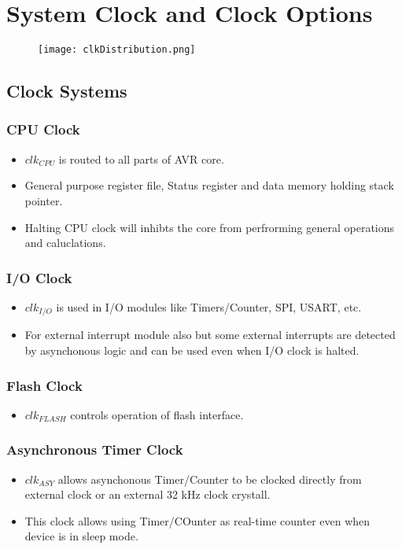 \section{System Clock and Clock Options}
\begin{figure}[H]
    \begin{center}
        \texttt{[image: clkDistribution.png]}
    \end{center}
\end{figure}

\subsection{Clock Systems}
\subsubsection{CPU Clock}
\begin{itemize}
    \item $clk_{CPU}$ is routed to all parts of AVR core.
    \item General purpose register file, Status register and data memory holding stack pointer.
    \item Halting CPU clock will inhibts the core from perfrorming general operations and caluclations.
\end{itemize}

\subsubsection{I/O Clock}
\begin{itemize}
    \item $clk_{I/O}$ is used in I/O modules like Timers/Counter, SPI, USART, etc.
    \item For external interrupt module also but some external interrupts are detected by asynchonous logic and can be used even when I/O clock is halted.
\end{itemize}

\subsubsection{Flash Clock}
\begin{itemize}
    \item $clk_{FLASH}$ controls operation of flash interface.
\end{itemize}


\subsubsection{Asynchronous Timer Clock}
\begin{itemize}
    \item $clk_{ASY}$ allows asynchonous Timer/Counter to be clocked directly from external clock or an external 32 kHz clock crystall.
    \item This clock allows using Timer/COunter as real-time counter even when device is in sleep mode.
\end{itemize}

